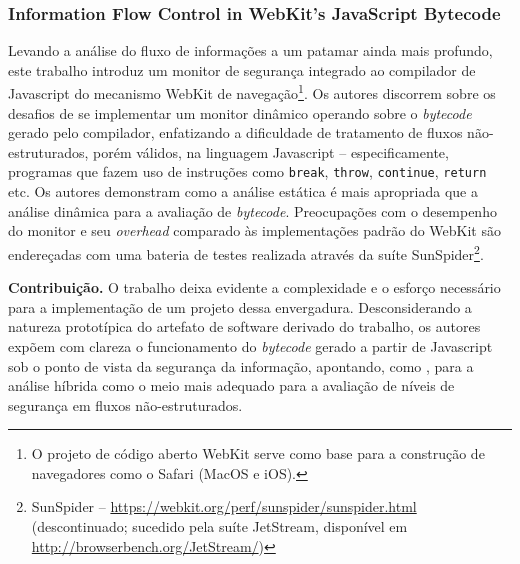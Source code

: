\subsubsection{Information Flow Control in WebKit's JavaScript Bytecode \cite{Bichhawat2014}}
Levando a análise do fluxo de informações a um patamar ainda mais profundo, este trabalho introduz um monitor de segurança integrado ao compilador de Javascript do mecanismo WebKit de navegação\footnote{O projeto de código aberto WebKit serve como base para a construção de navegadores como o Safari (MacOS e iOS).}. Os autores discorrem sobre os desafios de se implementar um monitor dinâmico operando sobre o \textit{bytecode} gerado pelo compilador, enfatizando a dificuldade de tratamento de fluxos não-estruturados, porém válidos, na linguagem Javascript -- especificamente, programas que fazem uso de instruções como \texttt{break}, \texttt{throw}, \texttt{continue}, \texttt{return} etc. Os autores demonstram como a análise estática é mais apropriada que a análise dinâmica para a avaliação de \textit{bytecode}. Preocupações com o desempenho do monitor e seu \textit{overhead} comparado às implementações padrão do WebKit são endereçadas com uma bateria de testes realizada através da suíte SunSpider\footnote{SunSpider -- \url{https://webkit.org/perf/sunspider/sunspider.html} (descontinuado; sucedido pela suíte JetStream, disponível em \url{http://browserbench.org/JetStream/})}.

\textbf{Contribuição.} O trabalho deixa evidente a complexidade e o esforço necessário para a implementação de um projeto dessa envergadura. Desconsiderando a natureza prototípica do artefato de software derivado do trabalho, os autores expõem com clareza o funcionamento do \textit{bytecode} gerado a partir de Javascript sob o ponto de vista da segurança da informação, apontando, como \cite{Hedin2014}, para a análise híbrida como o meio mais adequado para a avaliação de níveis de segurança em fluxos não-estruturados.


